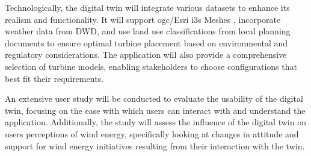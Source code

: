 \documentclass[11pt, titlepage, a4paper]{scrartcl}
\begin{document}
\begin{linenumbers}
    Technologically, the digital twin will integrate various datasets to enhance its realism and functionality. It will support \gls{ogc}/Esri \gls{i3s} Meshes \cite{esriincI3sspec}, incorporate weather data from DWD, and use land use classifications from local planning documents %
    to ensure optimal turbine placement based on environmental and regulatory considerations. The application will also provide a comprehensive selection of turbine models, enabling stakeholders to choose configurations that best fit their requirements.

    An extensive user study will be conducted to evaluate the usability of the digital twin, focusing on the ease with which users can interact with and understand the application. Additionally, the study will assess the influence of the digital twin on users perceptions of wind energy, specifically looking at changes in attitude and support for wind energy initiatives resulting from their interaction with the twin.






\end{linenumbers}
\end{document}
